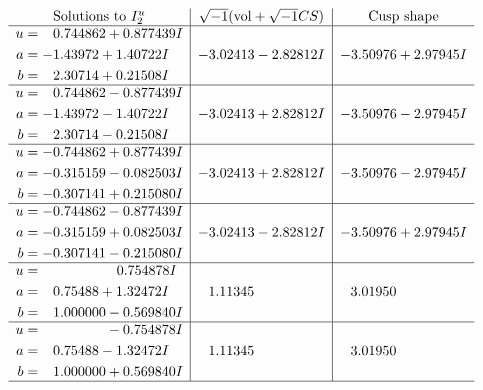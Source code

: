 \documentclass[1p]{elsarticle_modified}
\theoremstyle{definition}
\newcommand{\I}{\sqrt{-1}}
\begin{document}
$$\begin{array}{c|c|c}  
\text{Solutions to }I^u_{2}& \I (\text{vol} + \sqrt{-1}CS) & \text{Cusp shape}\\
 \hline 
\begin{aligned}
u &= \phantom{-}0.744862 + 0.877439 I \\
a &= -1.43972 + 1.40722 I \\
b &= \phantom{-}2.30714 + 0.21508 I\end{aligned}
 & -3.02413 - 2.82812 I & -3.50976 + 2.97945 I \\ \hline\begin{aligned}
u &= \phantom{-}0.744862 - 0.877439 I \\
a &= -1.43972 - 1.40722 I \\
b &= \phantom{-}2.30714 - 0.21508 I\end{aligned}
 & -3.02413 + 2.82812 I & -3.50976 - 2.97945 I \\ \hline\begin{aligned}
u &= -0.744862 + 0.877439 I \\
a &= -0.315159 - 0.082503 I \\
b &= -0.307141 + 0.215080 I\end{aligned}
 & -3.02413 + 2.82812 I & -3.50976 - 2.97945 I \\ \hline\begin{aligned}
u &= -0.744862 - 0.877439 I \\
a &= -0.315159 + 0.082503 I \\
b &= -0.307141 - 0.215080 I\end{aligned}
 & -3.02413 - 2.82812 I & -3.50976 + 2.97945 I \\ \hline\begin{aligned}
u &= \phantom{-0.000000 -}0.754878 I \\
a &= \phantom{-}0.75488 + 1.32472 I \\
b &= \phantom{-}1.000000 - 0.569840 I\end{aligned}
 & \phantom{-}1.11345\phantom{ +0.000000I} & \phantom{-}3.01950\phantom{ +0.000000I} \\ \hline\begin{aligned}
u &= \phantom{-0.000000 } -0.754878 I \\
a &= \phantom{-}0.75488 - 1.32472 I \\
b &= \phantom{-}1.000000 + 0.569840 I\end{aligned}
 & \phantom{-}1.11345\phantom{ +0.000000I} & \phantom{-}3.01950\phantom{ +0.000000I}\\
 \hline 
 \end{array}$$\newpage\newpage\renewcommand{\arraystretch}{1}
\end{document}
